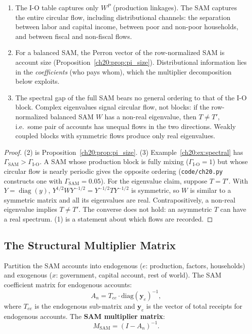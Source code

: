 \documentclass[../structural_economics_book.tex]{subfiles}
\begin{document}
\begin{proposition}\label{ch20:prop:more_structure}
\begin{enumerate}
\item The I-O table captures only $W^P$ (production linkages). The SAM captures the entire circular flow, including distributional channels: the separation between labor and capital income, between poor and non-poor households, and between fiscal and non-fiscal flows.
\item For a balanced SAM, the Perron vector of the row-normalized SAM is account size (Proposition~\ref{ch20:prop:pi_size}). Distributional information lies in the \emph{coefficients} (who pays whom), which the multiplier decomposition below exploits.
\item The spectral gap of the full SAM bears no general ordering to that of the I-O block. Complex eigenvalues signal circular flow, not blocks: if the row-normalized balanced SAM $W$ has a non-real eigenvalue, then $T \ne T'$, i.e.\ some pair of accounts has unequal flows in the two directions. Weakly coupled blocks with symmetric flows produce only real eigenvalues.
\end{enumerate}
\end{proposition}

\begin{proof}
(2) is Proposition~\ref{ch20:prop:pi_size}. (3) Example~\ref{ch20:ex:spectral} has $\Gamma_{\text{SAM}} > \Gamma_{\text{I-O}}$. A SAM whose production block is fully mixing ($\Gamma_{\text{I-O}} = 1$) but whose circular flow is nearly periodic gives the opposite ordering (\texttt{code/ch20.py} constructs one with $\Gamma_{\text{SAM}} = 0.05$). For the eigenvalue claim, suppose $T = T'$. With $Y = \operatorname{diag}(y)$, $Y^{1/2}WY^{-1/2} = Y^{-1/2}TY^{-1/2}$ is symmetric, so $W$ is similar to a symmetric matrix and all its eigenvalues are real. Contrapositively, a non-real eigenvalue implies $T \ne T'$. The converse does not hold: an asymmetric $T$ can have a real spectrum. (1) is a statement about which flows are recorded.
\end{proof}


\subsection{The Structural Multiplier Matrix}

\begin{definition}\label{ch20:def:multiplier}
Partition the SAM accounts into endogenous ($e$: production, factors, households) and exogenous ($x$: government, capital account, rest of world). The SAM coefficient matrix for endogenous accounts:
\begin{equation}\label{ch20:eq:sam_A}
A_n = T_{ee} \cdot \text{diag}(\mathbf{y}_e)^{-1},
\end{equation}
where $T_{ee}$ is the endogenous sub-matrix and $\mathbf{y}_e$ is the vector of total receipts for endogenous accounts. The \textbf{SAM multiplier matrix}:
\begin{equation}\label{ch20:eq:sam_mult}
M_{\text{SAM}} = (I - A_n)^{-1}.
\end{equation}
\end{definition}
\end{document}
